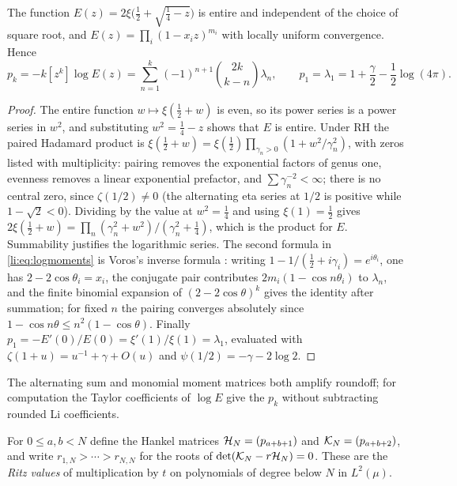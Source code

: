 \begin{proposition}\label{li:prop:moments}
The function $E(z)=2\xi\bigl(\frac12+\sqrt{\frac14-z}\bigr)$ is entire and independent of the
choice of square root, and $E(z)=\prod_i(1-x_iz)^{m_i}$ with locally uniform convergence. Hence
\begin{equation}\label{li:eq:logmoments}
 p_k=-k[z^k]\log E(z)=\sum_{n=1}^k(-1)^{n+1}\binom{2k}{k-n}\lambda_n,\qquad
 p_1=\lambda_1=1+\frac\gamma2-\frac12\log(4\pi).
\end{equation}
\end{proposition}

\begin{proof}
The entire function $w\mapsto\xi(\frac12+w)$ is even, so its power series is a power series in
$w^2$, and substituting $w^2=\frac14-z$ shows that $E$ is entire. Under RH the paired Hadamard
product is $\xi(\frac12+w)=\xi(\frac12)\prod_{\gamma_n>0}(1+w^2/\gamma_n^2)$, with zeros listed with
multiplicity: pairing removes the exponential factors of genus one, evenness removes a linear
exponential prefactor, and $\sum\gamma_n^{-2}<\infty$; there is no central zero, since
$\zeta(1/2)\ne0$ (the alternating eta series at $1/2$ is positive while $1-\sqrt2<0$). Dividing by
the value at $w^2=\frac14$ and using $\xi(1)=\frac12$ gives
$2\xi(\frac12+w)=\prod_n(\gamma_n^2+w^2)/(\gamma_n^2+\frac14)$, which is the product for $E$.
Summability justifies the logarithmic series. The second formula in \eqref{li:eq:logmoments} is
Voros's inverse formula \cite[eq.~(11)]{Voros2006Sharpenings}: writing
$1-1/(\frac12+i\gamma_i)=e^{i\theta_i}$, one has $2-2\cos\theta_i=x_i$, the conjugate pair contributes
$2m_i(1-\cos n\theta_i)$ to $\lambda_n$, and the finite binomial expansion of $(2-2\cos\theta)^k$
gives the identity after summation; for fixed $n$ the pairing converges absolutely since
$1-\cos n\theta\le n^2(1-\cos\theta)$. Finally $p_1=-E'(0)/E(0)=\xi'(1)/\xi(1)=\lambda_1$, evaluated
with $\zeta(1+u)=u^{-1}+\gamma+O(u)$ and $\psi(1/2)=-\gamma-2\log2$.
\end{proof}

The alternating sum and monomial moment matrices both amplify roundoff; for computation the
Taylor coefficients of $\log E$ give the $p_k$ without subtracting rounded Li coefficients.

For $0\le a,b<N$ define the Hankel matrices $\mathcal{H}_N=(p_{a+b+1})$ and $\mathcal{K}_N=(p_{a+b+2})$, and
write $r_{1,N}>\cdots>r_{N,N}$ for the roots of $\det(\mathcal{K}_N-r\mathcal{H}_N)=0$. These are the
\emph{Ritz values} of multiplication by $t$ on polynomials of degree below $N$ in $L^2(\mu)$.

